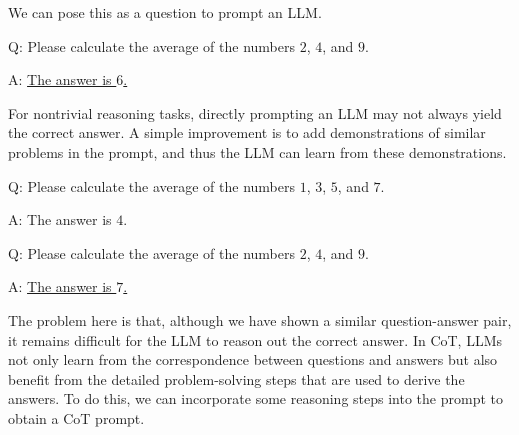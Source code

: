 \vspace{0.8em}

\noindent We can pose this as a question to prompt an LLM.

\vspace{0.5em}
\begin{tcolorbox}

\begingroup
\setlength{\leftskip}{2em}
\setlength{\rightskip}{2em}

Q: Please calculate the average of the numbers $2$, $4$, and $9$.

\vspace{0.3em}

A: \underline{The answer is $6$.}

\endgroup

\end{tcolorbox}
\vspace{0.5em}

For nontrivial reasoning tasks, directly prompting an LLM may not always yield the correct answer. A simple improvement is to add demonstrations of similar problems in the prompt, and thus the LLM can learn from these demonstrations.

\vspace{0.5em}
\begin{tcolorbox}

\begingroup
\setlength{\leftskip}{2em}
\setlength{\rightskip}{2em}

Q: Please calculate the average of the numbers $1$, $3$, $5$, and $7$.

\vspace{0.3em}

A: The answer is $4$.

\vspace{0.7em}

Q: Please calculate the average of the numbers $2$, $4$, and $9$.

\vspace{0.3em}

A: \underline{The answer is $7$.}

\endgroup

\end{tcolorbox}
\vspace{0.5em}

The problem here is that, although we have shown a similar question-answer pair, it remains difficult for the LLM to reason out the correct answer. In CoT, LLMs not only learn from the correspondence between questions and answers but also benefit from the detailed problem-solving steps that are used to derive the answers. To do this, we can incorporate some reasoning steps into the prompt to obtain a CoT prompt.

